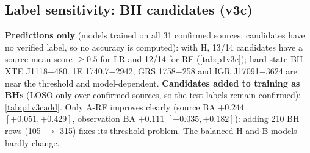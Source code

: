 \subsection{Label sensitivity: BH candidates (v3c)}
\Descriptive{} \textbf{Predictions only} (models trained on all 31 confirmed sources; candidates have no verified label, so
no accuracy is computed): with H, 13/14 candidates have a source-mean score $\ge0.5$ for LR and 12/14 for RF
(\cref{tab:p1v3c});
hard-state BH XTE J1118+480. 1E 1740.7$-$2942, GRS 1758$-$258 and IGR J17091$-$3624 are near the threshold and model-dependent.
\Secondary{} \textbf{Candidates added to training as BHs} (LOSO only over confirmed sources, so the test labels remain
confirmed): \cref{tab:p1v3cadd}. Only A-RF improves clearly (source BA $+0.244$ $[+0.051,+0.429]$, observation BA $+0.111$
$[+0.035,+0.182]$): adding 210 BH rows (105 $\to$ 315) fixes its threshold problem. The balanced H and B models hardly change.

